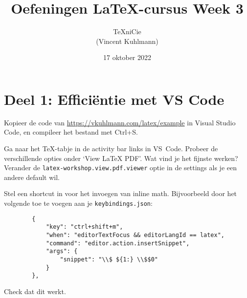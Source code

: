 \documentclass[a4paper]{article}
\title{\vspace{-65pt} Oefeningen \LaTeX-cursus Week 3}
\author{\TeX niCie\\{\small (Vincent Kuhlmann)}}
\date{17 oktober 2022}
\begin{document}
\maketitle


\section{Deel 1: Effici\"entie met VS Code}

\begin{exercise}[Compilatie]
    Kopieer de code van \url{https://vkuhlmann.com/latex/example} in Visual Studio Code,
    en compileer het bestand met Ctrl+S.
\end{exercise}

\begin{exercise}
    Ga naar het TeX-tabje in de activity bar links in VS~Code. Probeer de verschillende opties
    onder `View LaTeX PDF'. Wat vind je het fijnste werken?
    Verander de \texttt{latex-workshop.view.pdf.viewer} optie in de settings als je
    een andere default wil.
\end{exercise}

\begin{exercise}
    Stel een shortcut in voor het invoegen van inline math. Bijvoorbeeld door
    het volgende toe te voegen aan je \texttt{keybindings.json}:
    \begin{verbatim}
        {
            "key": "ctrl+shift+m",
            "when": "editorTextFocus && editorLangId == latex",
            "command": "editor.action.insertSnippet",
            "args": {
                "snippet": "\\$ ${1:} \\$$0"
            }
        },
    \end{verbatim}
    Check dat dit werkt.
\end{exercise}

\end{document}
